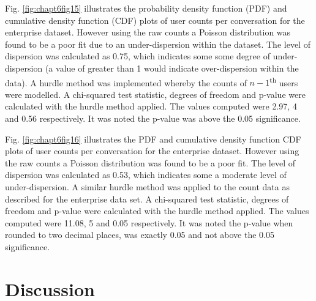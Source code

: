 Fig. \ref{fig:chapt6fig15} illustrates the probability density function (PDF) and cumulative density function (CDF) plots of user counts per conversation for the enterprise dataset. However using the raw counts a Poisson distribution was found to be a poor fit due to an under-dispersion within the dataset. The level of dispersion was calculated as 0.75, which indicates some some degree of under-dispersion (a value of greater than 1 would indicate over-dispersion within the data). A hurdle method was implemented whereby the counts of $n-1$\textsuperscript{th} users were modelled. A chi-squared test statistic, degrees of freedom and p-value were calculated with the hurdle method applied. The values computed were 2.97, 4 and 0.56 respectively. It was noted the p-value was above the 0.05 significance.

Fig. \ref{fig:chapt6fig16} illustrates the PDF and cumulative density function CDF  plots of user counts per conversation for the enterprise dataset. However using the raw counts a Poisson distribution was found to be a poor fit. The level of dispersion was calculated as 0.53, which indicates some a moderate level of under-dispersion. A similar hurdle method was applied to the count data as described for the enterprise data set. A chi-squared test statistic, degrees of freedom and p-value were calculated with the hurdle method applied. The values computed were 11.08, 5 and 0.05 respectively. It was noted the p-value when rounded to two decimal places, was exactly 0.05 and not above the 0.05 significance.

\section{Discussion}


